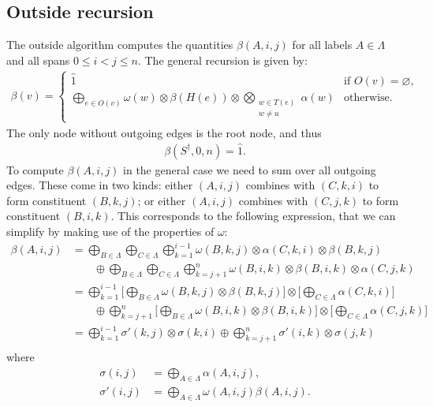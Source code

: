 \subsection{Outside recursion}
  The outside algorithm computes the quantities $\beta(A,i,j)$ for all labels $A \in \Lambda$ and all spans $0 \leq i < j \leq n$. The general recursion is given by:
  \begin{align*}
    \beta(v) =
      \begin{cases}
        \hat{1}  & \mbox{if } O(v) = \varnothing, \\
        \displaystyle\bigoplus_{e \in O(v)} \omega(w) \otimes \beta(H(e)) \otimes \displaystyle\bigotimes_{ \substack{ w \in T(e) \\ w \neq u } } \alpha(w)  & \mbox{otherwise.}
      \end{cases}
  \end{align*}
  The only node without outgoing edges is the root node, and thus
  \begin{align*}
    \beta(S^{\dagger}, 0, n) = \hat{1}.
  \end{align*}
  To compute $\beta(A, i, j)$ in the general case we need to sum over all outgoing edges. These come in two kinds: either $(A, i, j)$ combines with $(C, k, i)$ to form constituent $(B, k, j)$; or either $(A, i, j)$ combines with $(C, j, k)$ to form constituent $(B, i, k)$. This corresponds to the following expression, that we can simplify by making use of the properties of $\omega$:
  \begin{align*}
    \beta(A, i, j)
      &= \bigoplus_{B \in \Lambda} \bigoplus_{C \in \Lambda} \bigoplus_{k=1}^{i-1} \omega(B, k, j) \otimes \alpha(C, k, i) \otimes \beta(B, k, j) \\
        &\qquad \oplus \bigoplus_{B \in \Lambda} \bigoplus_{C \in \Lambda} \bigoplus_{k=j+1}^{n} \omega(B, i, k) \otimes \beta(B, i, k) \otimes \alpha(C, j, k) \\
      &=  \bigoplus_{k=1}^{i-1}  \Bigg[ \bigoplus_{B \in \Lambda} \omega(B, k, j)  \otimes \beta(B, k, j) \Bigg] \otimes \Bigg[ \bigoplus_{C \in \Lambda} \alpha(C, k, i) \Bigg] \\
        &\qquad \oplus \bigoplus_{k=j+1}^{n}  \Bigg[ \bigoplus_{B \in \Lambda}  \omega(B, i, k) \otimes \beta(B, i, k) \Bigg] \otimes  \Bigg[  \bigoplus_{C \in \Lambda} \alpha(C, j, k) \Bigg] \\
      &=  \bigoplus_{k=1}^{i-1}  \sigma'(k, j) \otimes \sigma(k, i) \oplus \bigoplus_{k=j+1}^{n} \sigma'(i, k) \otimes  \sigma(j, k) \\
  \end{align*}
  where
  \begin{align*}
      \sigma(i, j) &= \bigoplus_{A \in \Lambda} \alpha(A, i, j),  \\
      \sigma'(i, j) &= \bigoplus_{A \in \Lambda} \omega(A, i, j) \beta(A, i, j).
  \end{align*}

